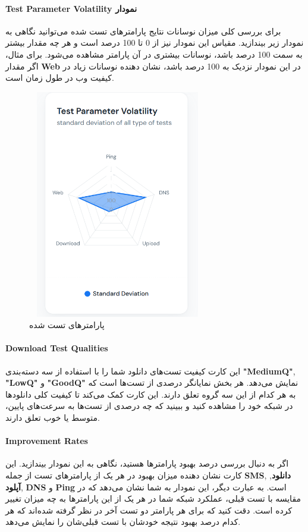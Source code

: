 \documentclass{report}
\begin{document}
\paragraph{Test Parameter Volatility نمودار}
برای بررسی کلی میزان نوسانات نتایج پارامترهای تست شده می‌توانید نگاهی به نمودار زیر بیندازید. مقیاس این نمودار نیز از 0 تا 100 درصد است و هر چه مقدار بیشتر به سمت 100 درصد باشد، نوسانات بیشتری در آن پارامتر مشاهده می‌شود. برای مثال، اگر مقدار \textbf{Web} در این نمودار نزدیک به 100 درصد باشد، نشان دهنده نوسانات زیاد در کیفیت وب در طول زمان است.
 \begin{figure}[h]
	\centering
	\includegraphics[width=0.7\textwidth,height=10cm,keepaspectratio]{Pic/param}
	\caption{پارامترهای تست شده}
	\label{fig:parameter}
\end{figure}
\paragraph{Download Test Qualities}
این کارت کیفیت تست‌های دانلود شما را با استفاده از سه دسته‌بندی \textbf{"MediumQ"}, \textbf{"LowQ"} و \textbf{"GoodQ"} نمایش می‌دهد. هر بخش نمایانگر درصدی از تست‌ها است که به هر کدام از این سه گروه تعلق دارند. این کارت کمک می‌کند تا کیفیت کلی دانلودها در شبکه خود را مشاهده کنید و ببینید که چه درصدی از تست‌ها به سرعت‌های پایین، متوسط یا خوب تعلق دارند.

\paragraph{Improvement Rates}
اگر به دنبال بررسی درصد بهبود پارامترها هستید، نگاهی به این نمودار بیندازید. این کارت نشان دهنده میزان بهبود در هر یک از پارامترهای تست از جمله \textbf{SMS}, \textbf{دانلود}, \textbf{آپلود}, \textbf{DNS} و \textbf{Ping} است. به عبارت دیگر، این نمودار به شما نشان می‌دهد که در مقایسه با تست قبلی، عملکرد شبکه شما در هر یک از این پارامترها به چه میزان تغییر کرده است. دقت کنید که برای هر پارامتر دو تست آخر در نظر گرفته شده‌اند که هر کدام درصد بهبود نتیجه خودشان با تست قبلی‌شان را نمایش می‌دهد.
\end{document}
